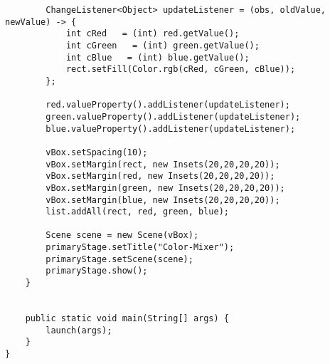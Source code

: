 \documentclass[12pt,a4paper,oneside,ngerman]{article}
\begin{document}
\begin{lstlisting}
        ChangeListener<Object> updateListener = (obs, oldValue, newValue) -> {
            int cRed   = (int) red.getValue();
            int cGreen   = (int) green.getValue();
            int cBlue   = (int) blue.getValue();
            rect.setFill(Color.rgb(cRed, cGreen, cBlue));
        };

        red.valueProperty().addListener(updateListener);
        green.valueProperty().addListener(updateListener);
        blue.valueProperty().addListener(updateListener);

        vBox.setSpacing(10);
        vBox.setMargin(rect, new Insets(20,20,20,20));
        vBox.setMargin(red, new Insets(20,20,20,20));
        vBox.setMargin(green, new Insets(20,20,20,20));
        vBox.setMargin(blue, new Insets(20,20,20,20));
        list.addAll(rect, red, green, blue);

        Scene scene = new Scene(vBox);
        primaryStage.setTitle("Color-Mixer");
        primaryStage.setScene(scene);
        primaryStage.show();
    }


    public static void main(String[] args) {
        launch(args);
    }
}

\end{lstlisting}
\end{document}
